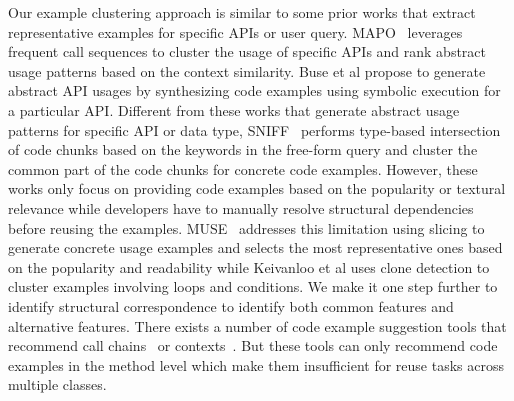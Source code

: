 

Our example clustering approach is similar to some prior works that extract representative examples for specific APIs or user query. 
MAPO~\cite{MAPO:ECOOP09} leverages frequent call sequences to cluster the usage of specific APIs and rank abstract usage patterns based on the context similarity. Buse et al\/\cite{Buse:apiICSE12} propose to generate abstract API usages by synthesizing code examples using symbolic execution for a particular API. Different from these works that generate abstract usage patterns for specific API or data type, SNIFF~\cite{sniff:Sen09} performs type-based intersection of code chunks based on the keywords in the free-form query and cluster the common part of the code chunks for concrete code examples. However, these works   only focus on providing code examples based on the popularity or textural relevance while developers have to manually resolve structural dependencies before reusing the examples.  MUSE~\cite{MUSE:MarcusICSE15} addresses this limitation using slicing to generate concrete usage examples and selects the most representative ones based on the popularity and readability while  Keivanloo et al\/\cite{spotWork:ICSE14} uses clone detection to cluster examples involving loops and conditions. We make it one step further to  identify structural correspondence to identify both common features and alternative features.  There exists a number of code example suggestion tools that recommend call chains~\cite{Mandelin:jungloid05, parseWeb:ASE07, Xsnippet:OOPSLA06}  or contexts~\cite{Holmes:structural05, Prompter:MSR14}. But these tools can only recommend code examples in the method level which make them insufficient for  reuse tasks across multiple classes.  


